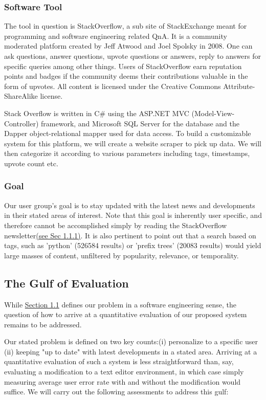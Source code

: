 \documentclass{sig-alternate-05-2015}
\begin{document}
\subsubsection{Software Tool}

The tool in question is StackOverflow, a sub site of StackExchange meant for programming and software engineering related QnA. It is a community moderated platform created by Jeff Atwood and Joel Spolsky in 2008. One can ask questions, answer questions, upvote questions or answers, reply to answers for specific queries among other things. Users of StackOverflow earn reputation points and badges if the community deems their contributions valuable in the form of upvotes. All content is licensed under the Creative Commons Attribute-ShareAlike license.

Stack Overflow is written in C\# using the ASP.NET MVC (Model-View-Controller) framework, and Microsoft SQL Server for the database and the Dapper object-relational mapper used for data access. To build a customizable system for this platform, we will create a website scraper to pick up data. We will then categorize it according to various parameters including tags, timestamps, upvote count etc.

\subsubsection{Goal}

Our user group's goal is to stay updated with the latest news and developments in their stated areas of interest. Note that this goal is inherently user specific, and therefore cannot be accomplished simply by reading the StackOverflow newsletter\hyperref[this]{(see Sec 1.1.1)}. It is also pertinent to point out that a search based on tags, such as 'python' (526584 results) or 'prefix trees' (20083 results) would yield large masses of content, unfiltered by popularity, relevance, or temporality.

\subsection{The Gulf of Evaluation}
While \hyperref[this]{Section 1.1} defines our problem in a software engineering sense, the question of how to arrive at a quantitative evaluation of our proposed system remains to be addressed.

Our stated problem is defined on two key counts:(i) personalize to a specific user (ii) keeping "up to date" with latest developments in a stated area. Arriving at a quantitative evaluation of such a system is less straightforward than, say, evaluating a modification to a text editor environment, in which case simply measuring average user error rate with and without the modification would suffice. We will carry out the following assessments to address this gulf:
\end{document}
